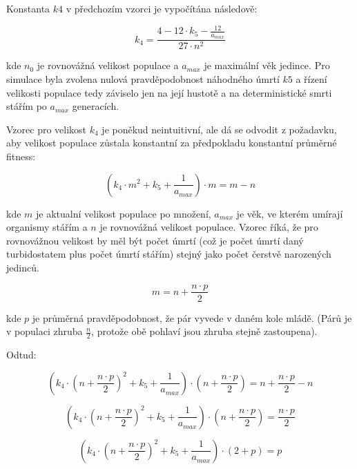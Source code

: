 Konstanta $k4$ v předchozím vzorci je vypočítána následově:

\begin{equation}
k_4 = \frac{4 - 12\cdot{}{k_5} - \frac{12}{a_{max}}}
           {27\cdot{}n^2}
\end{equation}


kde $n_0$ je rovnovážná velikost populace a $a_{max}$ je maximální věk jedince.
Pro simulace byla zvolena nulová pravděpodobnost náhodného úmrtí $k5$ a řízení velikosti populace tedy záviselo jen na
její hustotě a na deterministické smrti stářím po $a_{max}$ generacích.

Vzorec pro velikost $k_4$ je poněkud neintuitivní, ale dá se odvodit z požadavku, aby velikost populace zůstala
konstantní za předpokladu konstantní průměrné fitness:

\begin{equation}
(k_4\cdot{m^2} + {k_5} + \frac{1}{a_{max}})\cdot{m} = m - n
\end{equation}

kde $m$ je aktualní velikost populace po množení, $a_{max}$ je věk, ve kterém umírají organismy stářím a $n$ je rovnovážná
velikost populace. Vzorec říká, že pro rovnovážnou velikost by měl být počet úmrtí (což je počet úmrtí daný
turbidostatem plus počet úmrtí stářím) stejný jako počet čerstvě narozených jedinců.

\begin{equation}
m = n + \frac{n\cdot{}p}{2}
\end{equation}

kde $p$ je průměrná pravděpodobnost, že pár vyvede v daném kole mládě. (Párů je v populaci zhruba $\frac{n}{2}$, protože
obě pohlaví jsou zhruba stejně zastoupena).


Odtud:

\begin{equation}
(k_4\cdot{(n + \frac{n\cdot{}p}{2})^2} + {k_5} + \frac{1}{a_{max}})\cdot{(n + \frac{n\cdot{}p}{2})}
        = n + \frac{n\cdot{}p}{2}  - n
\end{equation}

\begin{equation}
(k_4\cdot{(n + \frac{n\cdot{}p}{2})^2} + {k_5} + \frac{1}{a_{max}})\cdot{(n + \frac{n\cdot{}p}{2})} = \frac{n\cdot{}p}{2}
\end{equation}

\begin{equation}
(k_4\cdot{(n + \frac{n\cdot{}p}{2})^2} + {k_5} + \frac{1}{a_{max}})\cdot{(2 + p)} = p
\end{equation}


